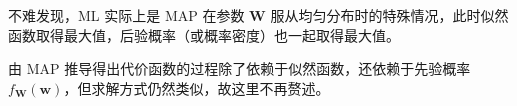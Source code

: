 \documentclass[UTF8, a4paper, oneside]{article}
\begin{document}
不难发现，ML 实际上是 MAP 在参数 $\boldsymbol{W}$ 服从均匀分布时的特殊情况，此时似然函数取得最大值，后验概率（或概率密度）也一起取得最大值。

由 MAP 推导得出代价函数的过程除了依赖于似然函数，还依赖于先验概率 $f_{\boldsymbol{W}}(\boldsymbol{w})$，但求解方式仍然类似，故这里不再赘述。

\section{}
\end{document}
